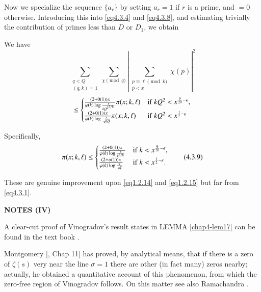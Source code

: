 Now we specialize the sequence $\{a_r\}$ by setting $a_r = 1 $ if $r$
is a prime, and $= 0$ otherwise. Introducing  this into \eqref{eq4.3.4} and
\eqref{eq4.3.8}, and estimating trivially the contribution of primes less than
$D$ or $D_1$, we obtain 

\begin{theorem}\label{chap4-thm13}
We have
  $$
  \sum_{\substack{q < Q\\ (q,k) = 1}} \sum\limits_{\chi \pmod{q}}
  |\sum_{\substack{ p \equiv \ell \pmod{k} \\ p < x}} \chi(p)|^2 
  $$
  \begin{equation*}
    \le
    \begin{cases}
      \frac{(2+0(1))x}{\varphi(k) \log \frac{x}{kQ^ {2^{3/8}}}} \pi
      (x;k,\ell) &{\rm if }~ kQ^2 < x^{\frac{9}{20}-\epsilon },\\ 
      \frac{(2+0(1)) x}{\varphi(k) \log \frac{x} {\sqrt{kQ}}} \pi
      (x;k,\ell) &{\rm if }~ kQ^2 < x^{\frac{1}{2}-\epsilon }  
    \end{cases}
  \end{equation*}\pageoriginale

  Specifically, 
  \begin{equation*}
    \pi (x;k,\ell) \le 
    \begin{cases}
      \frac{(2+0(1))x}{\varphi(k) \log \frac{x}{k^ {3/8}}}  & {\rm if }~
      k < x^{\frac{9}{20}-\epsilon },\\ 
      \frac{(2+o(1))x}{\varphi (k) \log \frac{x}{\sqrt{k}}} & {\rm if }~
      k <x^{\frac{1}{2}-\epsilon }.  
    \end{cases}\tag{4.3.9}\label{eq4.3.9}
  \end{equation*}
  
  These are genuine improvement upon \eqref{eq1.2.14} and
  \eqref{eq1.2.15} but far from  \eqref{eq4.3.1}. 
\end{theorem}

\begin{center} 
\textbf{NOTES (IV)} 
\end{center}

A clear-cut proof of Vinogradov's result states in LEMMA
\ref{chap4-lem17} can be found in the text book \cite{key42}. 

Montgomery [\cite{key48}, Chap 11] has proved, by analytical means, that if
there is a zero of $\zeta (s)$ very near the line $\sigma = 1$ there
are other (in fact many) zeros nearby; actually, he obtained a
quantitative account of this phenomenon, from which the zero-free
region of Vinogradov follows. On this matter see also Ramachandra
\cite{key64}.   


